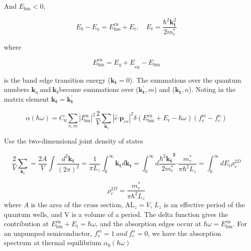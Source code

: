 And \(E_{\text{hm}} < 0\),

\begin{equation}
E_{b} - E_{a} = E_{\text{hm}}^{\text{en}} + E_{t},\quad
E_{t} = \frac{\hbar^{2}\bm{k}_{\bm{t}}^{2}}{2m_{e}^{*}}
\end{equation}

where

\begin{equation}
E_{\text{hm}}^{\text{en}} = {E_{g} + E}_{\text{en}} - E_{\text{hm}}
\end{equation}

is the band edge transition energy (\(\bm{k}_{\bm{t}} = 0\)).
The summations over the quantum numbers
\(\bm{k}_{a}\bm{\ }\text{and}\bm{\ }\bm{k}_{b}\)become
summations over (\(\bm{k}_{\bm{t}}^{\bm{'}},m\)) and
(\(\bm{k}_{\bm{t}},n\)). Noting in the matrix element
\(\bm{k}_{\bm{t}}\bm{=}\bm{k}_{\bm{t}}^{\bm{'}}\)

\begin{equation}
\alpha\left( \hbar\omega \right) = C_{0}\sum_{n,m}^{}\left| I_{\text{hm}}^{\text{en}} \right|^{2}\frac{2}{V}\sum_{\bm{k}_{t}}^{}\left| \hat{e}\bm{\cdot}\bm{p}_{\text{cv}} \right|^{2}\delta(E_{\text{hm}}^{\text{en}} + E_{t} - \hbar\omega)(f_{v}^{m} - f_{c}^{n})
\end{equation}

Use the two-dimensional joint density of states

\begin{equation}
\frac{2}{V}\sum_{\bm{k}_{t}}^{}{= \frac{2A}{V}}\int_{}^{}\frac{d^{2}\bm{k}_{\bm{t}}}{\left( 2\pi \right)^{2}} = \frac{1}{\pi L_{z}}\int_{0}^{\infty}\bm{k}_{\bm{t}}d\bm{k}_{\bm{t}}\bm{=}\int_{0}^{\infty}{d\frac{{{\hbar^{2}\bm{k}}_{\bm{t}}}^{\bm{2}}}{2m_{r}^{*}}}\bm{\cdot}\frac{m_{r}^{*}}{\pi\hbar^{2}L_{z}}\bm{=}\int_{0}^{\infty}{dE_{t}}\rho_{r}^{2D}
\end{equation}

\begin{equation}
\rho_{r}^{2D} = \frac{m_{r}^{*}}{\pi\hbar^{2}L_{z}}
\end{equation}
where \(A\) is the area of the cross section, \(\text{AL}_{z} = V\),
\(L_{z}\) is an effective period of the quantum wells, and V is a volume
of a period. The delta function gives the contribution at
\(E_{\text{hm}}^{\text{en}} + E_{t} = \hbar\omega\), and the
absorption edges occur at \(\hbar\omega = E_{\text{hm}}^{\text{en}}\).
For an unpumped semiconductor, \(f_{v}^{m} = 1\ and\ f_{c}^{n} = 0\), we
have the absorption spectrum at thermal equilibrium
\(\alpha_{0}\left( \hbar\omega \right)\)

